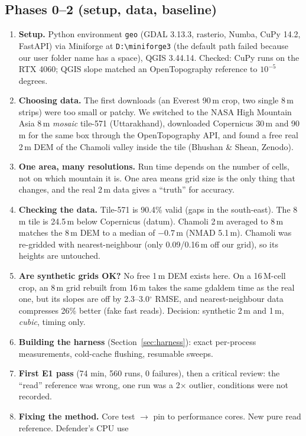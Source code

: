 ﻿\documentclass[11pt,a4paper]{article}
\newcommand{\code}[1]{\texttt{#1}}
\begin{document}
\subsection{Phases 0--2 (setup, data, baseline)}
\begin{enumerate}
\item \textbf{Setup.} Python environment \code{geo} (GDAL 3.13.3, rasterio, Numba, CuPy 14.2, FastAPI) via Miniforge at
\code{D:\textbackslash miniforge3} (the default path failed because our user folder name has a space), QGIS 3.44.14.
Checked: CuPy runs on the RTX 4060; QGIS slope matched an OpenTopography reference to $10^{-5}$ degrees.
\item \textbf{Choosing data.} The first downloads (an Everest 90\,m crop, two single 8\,m strips) were too small or
patchy. We switched to the NASA High Mountain Asia 8\,m \emph{mosaic} tile-571 (Uttarakhand), downloaded Copernicus
30\,m and 90\,m for the same box through the OpenTopography API, and found a free real 2\,m DEM of the Chamoli valley
inside the tile (Bhushan \& Shean, Zenodo).
\item \textbf{One area, many resolutions.} Run time depends on the number of cells, not on which mountain it is. One
area means grid size is the only thing that changes, and the real 2\,m data gives a ``truth'' for accuracy.
\item \textbf{Checking the data.} Tile-571 is 90.4\% valid (gaps in the south-east). The 8\,m tile is 24.5\,m below
Copernicus (datum). Chamoli 2\,m averaged to 8\,m matches the 8\,m DEM to a median of $-0.7$\,m (NMAD 5.1\,m). Chamoli
was re-gridded with nearest-neighbour (only 0.09/0.16\,m off our grid), so its heights are untouched.
\item \textbf{Are synthetic grids OK?} No free 1\,m DEM exists here. On a 16\,M-cell crop, an 8\,m grid rebuilt from
16\,m takes the same gdaldem time as the real one, but its slopes are off by 2.3--3.0$^\circ$ RMSE, and nearest-neighbour
data compresses 26\% better (fake fast reads). Decision: synthetic 2\,m and 1\,m, \emph{cubic}, timing only.
\item \textbf{Building the harness} (Section~\ref{sec:harness}): exact per-process measurements, cold-cache flushing,
resumable sweeps.
\item \textbf{First E1 pass} (74 min, 560 runs, 0 failures), then a critical review: the ``read'' reference was wrong,
one run was a 2$\times$ outlier, conditions were not recorded.
\item \textbf{Fixing the method.} Core test $\to$ pin to performance cores. New pure read reference. Defender's CPU use

\end{enumerate}
\end{document}
